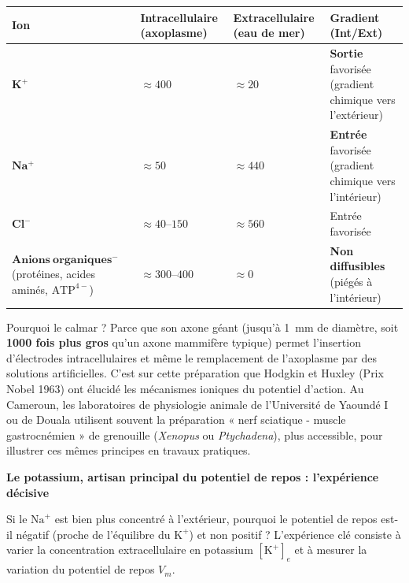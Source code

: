 \documentclass[11pt]{article}
\begin{document}
\begin{exemplebox}
\begin{center}
\begin{tabularx}{\linewidth}{|l|X|X|X|}\hline
\rowcolor{popblueL}
\textbf{Ion} & \textbf{Intracellulaire (axoplasme)} & \textbf{Extracellulaire (eau de mer)} & \textbf{Gradient (Int/Ext)} \\ \hline
$\mathbf{K^+}$ & $\approx 400$ & $\approx 20$ & \textbf{Sortie} favorisée (gradient chimique vers l'extérieur) \\ \hline
$\mathbf{Na^+}$ & $\approx 50$ & $\approx 440$ & \textbf{Entrée} favorisée (gradient chimique vers l'intérieur) \\ \hline
$\mathbf{Cl^-}$ & $\approx 40\text{--}150$ & $\approx 560$ & Entrée favorisée \\ \hline
$\mathbf{Anions\ organiques^-}$ (protéines, acides aminés, $\text{ATP}^{4-}$) & $\approx 300\text{--}400$ & $\approx 0$ & \textbf{Non diffusibles} (piégés à l'intérieur) \\ \hline
\end{tabularx}
\end{center}
\end{exemplebox}

\begin{savaistu}
Pourquoi le calmar ? Parce que son axone géant (jusqu'à \SI{1}{\milli\metre} de diamètre, soit \textbf{1000 fois plus gros} qu'un axone mammifère typique) permet l'insertion d'électrodes intracellulaires et même le remplacement de l'axoplasme par des solutions artificielles. C'est sur cette préparation que Hodgkin et Huxley (Prix Nobel 1963) ont élucidé les mécanismes ioniques du potentiel d'action. Au Cameroun, les laboratoires de physiologie animale de l'Université de Yaoundé I ou de Douala utilisent souvent la préparation « nerf sciatique - muscle gastrocnémien » de grenouille (\emph{Xenopus} ou \emph{Ptychadena}), plus accessible, pour illustrer ces mêmes principes en travaux pratiques.
\end{savaistu}

\textbf{Le potassium, artisan principal du potentiel de repos : l'expérience décisive}\par

Si le $\text{Na}^+$ est bien plus concentré à l'extérieur, pourquoi le potentiel de repos est-il négatif (proche de l'équilibre du $\text{K}^+$) et non positif ? L'expérience clé consiste à varier la concentration extracellulaire en potassium $[\text{K}^+]_e$ et à mesurer la variation du potentiel de repos $V_m$.
\end{document}
